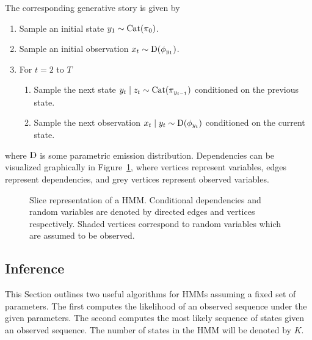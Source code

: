 \documentclass[12pt]{report}
\newcommand{\1}[0]{\mathbbm{1}}
\newcommand{\Cat}[0]{\textnormal{Cat}}
\newcommand{\SomeDist}[0]{\textnormal{D}}
\begin{document}
The corresponding generative story is given by

\begin{enumerate}
    \item Sample an initial state $y_1 \sim \Cat(\pi_0)$.
    \item Sample an initial observation $x_t \sim \SomeDist(\phi_{y_1})$.
    \item For $t = 2$ to $T$
    \begin{enumerate}
        \item Sample the next state $y_{t} \mid z_t \sim \Cat(\pi_{y_{t-1}})$ conditioned on the previous state.
        \item Sample the next observation $x_t \mid y_t \sim \SomeDist(\phi_{y_t})$ conditioned on the current state.
    \end{enumerate}
\end{enumerate}

where $\SomeDist$ is some parametric emission distribution.
Dependencies can be visualized graphically in Figure~\ref{fig:hmm},
where vertices represent variables, edges represent dependencies,
and grey vertices represent observed variables.

\begin{figure}[ht!]
    \centering
    \caption[Slice representation of a HMM]{
        Slice representation of a HMM.
        Conditional dependencies and random variables are denoted by
        directed edges and vertices respectively. Shaded vertices correspond
        to random variables which are assumed to be observed.
    }
    \label{fig:hmm}
\end{figure}

\subsection{Inference}
This Section outlines two useful algorithms for \acp{HMM}
assuming a fixed set of parameters. The first computes the
likelihood of an observed sequence under the given parameters.
The second computes the most likely sequence of states given
an observed sequence. The number of states in the \ac{HMM} will
be denoted by $K$.
\end{document}
